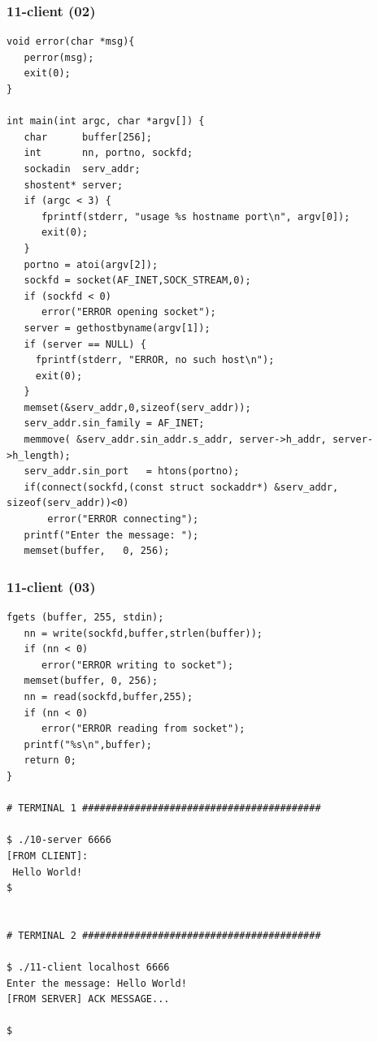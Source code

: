 \documentclass[xcolor=table, notheorems, hyperref={pdfpagelabels=false}]{beamer}
\begin{document}
\begin{frame}[fragile]
\frametitle{11-client (02)}
\begin{lstlisting}[basicstyle=\ttfamily\tiny]
void error(char *msg){
   perror(msg);
   exit(0);
}

int main(int argc, char *argv[]) {
   char      buffer[256];
   int       nn, portno, sockfd;
   sockadin  serv_addr;
   shostent* server;
   if (argc < 3) {
      fprintf(stderr, "usage %s hostname port\n", argv[0]);
      exit(0);
   }
   portno = atoi(argv[2]);
   sockfd = socket(AF_INET,SOCK_STREAM,0);
   if (sockfd < 0)
      error("ERROR opening socket");
   server = gethostbyname(argv[1]);
   if (server == NULL) {
     fprintf(stderr, "ERROR, no such host\n");
     exit(0);
   }
   memset(&serv_addr,0,sizeof(serv_addr));
   serv_addr.sin_family = AF_INET;
   memmove( &serv_addr.sin_addr.s_addr, server->h_addr, server->h_length);
   serv_addr.sin_port   = htons(portno);
   if(connect(sockfd,(const struct sockaddr*) &serv_addr, sizeof(serv_addr))<0)
       error("ERROR connecting");
   printf("Enter the message: ");
   memset(buffer,   0, 256);

\end{lstlisting}
\end{frame}

\begin{frame}[fragile]
\frametitle{11-client (03)}
\begin{lstlisting}[basicstyle=\ttfamily\tiny]
   fgets (buffer, 255, stdin);
   nn = write(sockfd,buffer,strlen(buffer));
   if (nn < 0)
      error("ERROR writing to socket");
   memset(buffer, 0, 256);
   nn = read(sockfd,buffer,255);
   if (nn < 0)
      error("ERROR reading from socket");
   printf("%s\n",buffer);
   return 0;
}

# TERMINAL 1 #########################################

$ ./10-server 6666
[FROM CLIENT]:
 Hello World!
$


# TERMINAL 2 #########################################

$ ./11-client localhost 6666
Enter the message: Hello World!
[FROM SERVER] ACK MESSAGE...

$

\end{lstlisting}
\end{frame}
\end{document}
